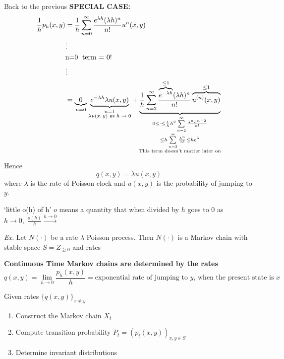 \documentclass[12pt]{article}
\begin{document}
\vspace{1\baselineskip}
Back to the previous {\bf SPECIAL CASE:}
\begin{align}
    \frac{1}{h}p_h(x,y) &= \frac{1}{h} \sum\limits_{n=0}^\infty \frac{e^{\lambda h}(\lambda h)^n}{n!} u^n(x,y) \nonumber \\
    &\vdots \nonumber \\
    &\text{n=0\; term = 0!} \nonumber \\
    &\vdots \nonumber \\
    &=\underbrace{0}_{n=0} \underbrace{e^{-\lambda h}\lambda u(x,y)}_{\substack{{n=1}\\ \text{$\lambda u(x,y)$ as $h\to 0$}}} + \underbrace{\frac{1}{h} \sum\limits_{n=2}^\infty \frac{\overbrace{e^{-\lambda h}}^{\le 1}(\lambda h)^n}{n!} \overbrace{u^{(n)}(x,y)}^{\le 1}}_{\substack{{0\le \cdot \le \frac{1}{h}h^2\sum\limits_{n=2}^\infty \frac{\lambda^n h^{n-2}}{h!}}\\ {\le h \sum\limits_{n=2}^\infty \frac{\lambda^n}{n!} \le h e^\lambda}
    \\ \text{This term doesn't matter later on}}} \nonumber
\end{align}

\vspace{1\baselineskip}
Hence $$q(x,y)=\lambda u(x,y)$$ where $\lambda$ is the rate of Poisson clock and $u(x,y)$ is the probability of jumping to $y$.

\vspace{1\baselineskip}
\textquoteleft little o(h) of h\textquoteright\; $o$ means a quantity that when divided by $h$ goes to 0 as $h\to 0,\;\frac{o(h)}{h}\xrightarrow{h\to 0}$

\vspace{1\baselineskip}
\Rightarrow {}

\vspace{1\baselineskip}
{\sl Ex.} Let $N(\cdot)$ be a rate $\lambda$ Poisson process. Then $N(\cdot)$ is a Markov chain with stable space $S=Z_{\ge 0}$ and rates

\newpage
{\bf Continuous Time Markov chains are determined by the rates}
$$q(x,y) = \lim\limits_{h\to 0} \frac{p_h(x,y)}{h} = \text{exponential rate of jumping to $y$, when the present state is $x$}$$

\vspace{1\baselineskip}
Given rates $\{q(x,y)\}_{x\neq y}$
\begin{enumerate}
    \item Construct the Markov chain $X_t$
    \item Compute transition probability $P_t = (p_t(x,y))_{x,y\in S}$
    \item Determine invariant distributions
\end{enumerate}
\end{document}
